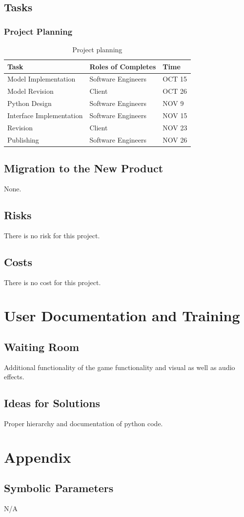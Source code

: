 \documentclass[10pt]{article}
\begin{document}
\subsection{Tasks}
\subsubsection{Project Planning}
\begin{table}[ht!]
    \caption{Project planning}
    \begin{center}
	\begin{tabular}{|p{2.5cm}|p{2.0cm}|p{2.0cm}|}
	\hline
	\textbf{Task} & \textbf{Roles of Completes} & \textbf{Time}\\
	\hline
      Model Implementation & Software Engineers & OCT 15\\
      \hline
      Model Revision & Client & OCT 26\\
      \hline
      Python Design & Software Engineers & NOV 9\\
      \hline
      Interface Implementation & Software Engineers & NOV 15\\
      \hline
      Revision & Client & NOV 23\\
      \hline
      Publishing & Software Engineers & NOV 26\\
      \hline
	\end{tabular}
    \end{center}
	\end{table}
\subsection{Migration to the New Product}
None.
\subsection{Risks}
There is no risk for this project.
\subsection{Costs}
There is no cost for this project.
\section{User Documentation and Training}
\subsection{Waiting Room}
Additional functionality of the game functionality and visual as well as audio effects.
\subsection{Ideas for Solutions}
Proper hierarchy and documentation of python code.
\section{Appendix}
\subsection{Symbolic Parameters}
N/A
\end{document}
